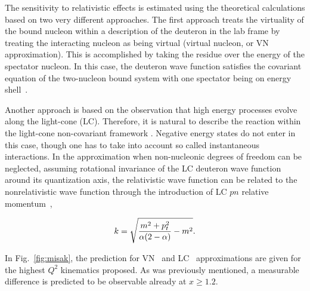 The sensitivity to relativistic effects is estimated using the theoretical calculations based on two 
very different approaches.   The first approach treats the  virtuality of the bound nucleon within a
description of the deuteron in the lab frame by treating the interacting nucleon as being 
virtual (virtual nucleon, or VN approximation). This is accomplished by taking the residue over the energy of the spectator nucleon.
In this case, the deuteron wave function satisfies the covariant equation of the two-nucleon bound system 
with one spectator being on energy shell~\cite{Sargsian:2009hf,Gross:2010qm}.

Another approach is based on the observation that high energy processes
evolve along the light-cone (LC).  Therefore, it is natural to describe the 
reaction within the light-cone non-covariant framework \cite{Frankfurt:1981mk}. 
Negative energy states do not enter in this case, though one has to take into 
account so called instantaneous interactions.
In the approximation when non-nucleonic degrees of freedom 
can be neglected, assuming rotational invariance of the LC deuteron wave function around its quantization axis, the relativistic wave function can be related to the nonrelativistic wave function through the introduction of LC $pn$ relative momentum~\cite{Frankfurt:1981mk, Miller:2009fc},

\begin{equation}
k=\sqrt{{m^2+p_t^2\over \alpha(2-\alpha)} - m^2}.
\end{equation}

In Fig.~\ref{fig:misak}, the prediction for VN~\cite{Sargsian:2009hf} and LC~\cite{Frankfurt:1993sp} approximations are given 
for the highest $Q^2$ kinematics proposed. As was previously mentioned, a measurable 
difference is predicted to be observable already at $x\ge 1.2$.
 
 

